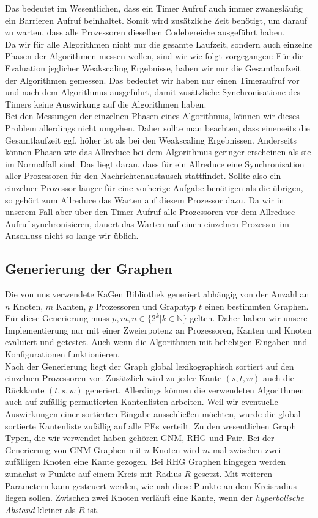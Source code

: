 Das bedeutet im Wesentlichen, dass ein Timer Aufruf auch immer zwangsläufig ein Barrieren Aufruf beinhaltet. Somit wird zusätzliche Zeit benötigt, um darauf zu warten, dass alle Prozessoren dieselben Codebereiche ausgeführt haben. \\
Da wir für alle Algorithmen nicht nur die gesamte Laufzeit, sondern auch einzelne Phasen der Algorithmen messen wollen, sind wir wie folgt vorgegangen: Für die Evaluation jeglicher Weakscaling Ergebnisse, haben wir nur die Gesamtlaufzeit der Algorithmen gemessen. Das bedeutet wir haben nur einen Timeraufruf vor und nach dem Algorithmus ausgeführt, damit zusätzliche Synchronisatione des Timers keine Auswirkung auf die Algorithmen haben.\\
Bei den Messungen der einzelnen Phasen eines Algorithmus, können wir dieses Problem allerdings nicht umgehen. Daher sollte man beachten, dass einerseits die Gesamtlaufzeit ggf. höher ist als bei den Weakscaling Ergebnissen. Anderseits können Phasen wie das Allreduce bei dem \boruvkaAllreduce Algorithmus geringer erscheinen als sie im Normalfall sind. Das liegt daran, dass für ein Allreduce eine Synchronisation aller Prozessoren für den Nachrichtenaustausch stattfindet. Sollte also ein einzelner Prozessor länger für eine vorherige Aufgabe benötigen als die übrigen, so gehört zum Allreduce das Warten auf diesem Prozessor dazu. Da wir in unserem Fall aber über den Timer Aufruf alle Prozessoren vor dem Allreduce Aufruf synchronisieren, dauert das Warten auf einen einzelnen Prozessor im Anschluss nicht so lange wir üblich.


\subsection{Generierung der Graphen}
Die von uns verwendete KaGen Bibliothek generiert abhängig von der Anzahl an $n$ Knoten, $m$ Kanten, $p$ Prozessoren und Graphtyp $t$ einen bestimmten Graphen. Für diese Generierung muss $p,m,n \in \{2^k | k \in \mathbb{N}\}$ gelten. Daher haben wir unsere Implementierung nur mit einer Zweierpotenz an Prozessoren, Kanten und Knoten evaluiert und getestet. Auch wenn die Algorithmen mit beliebigen Eingaben und Konfigurationen funktionieren. \\
Nach der Generierung liegt der Graph global lexikographisch sortiert auf den einzelnen Prozessoren vor. Zusätzlich wird zu jeder Kante $(s,t,w)$ auch die Rückkante $(t,s,w)$ generiert. 
Allerdings können die verwendeten Algorithmen auch auf zufällig permutierten Kantenlisten arbeiten. Weil wir eventuelle Auswirkungen einer sortierten Eingabe ausschließen möchten, wurde die global sortierte Kantenliste zufällig auf alle PEs verteilt. 
Zu den wesentlichen Graph Typen, die wir verwendet haben gehören GNM, RHG und Pair. 
Bei der Generierung von GNM Graphen mit $n$ Knoten wird $m$ mal zwischen zwei zufälligen Knoten eine Kante gezogen.
Bei RHG Graphen hingegen werden zunächst $n$ Punkte auf einem Kreis mit Radius $R$ gesetzt. Mit weiteren Parametern kann gesteuert werden, wie nah diese Punkte an dem Kreisradius liegen sollen. Zwischen zwei Knoten verläuft eine Kante, wenn der \emph{hyperbolische Abstand} kleiner als $R$ ist. \\

